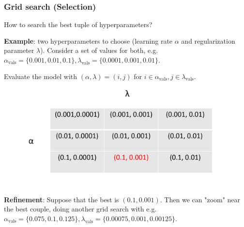 \documentclass{beamer}
\begin{document}
	\begin{frame}
		\frametitle{Grid search (Selection)}
		
		How to search the best tuple of hyperparameters?
		
		\vspace{5mm}
		
		\textbf{Example}: two hyperparameters to choose (learning rate $\alpha$ and regularization parameter $\lambda$). Consider a set of values for both, e.g. $\alpha_{\text{vals}} = \{0.001, 0.01, 0.1\}, \lambda_{\text{vals}} = \{0.0001, 0.001, 0.01\}$. 
		
		Evaluate the model with $(\alpha, \lambda) = (i,j)$ for $i \in \alpha_{\text{vals}}, j \in \lambda_{\text{vals}}$.
		
		\begin{figure}
			\centering
			\includegraphics[scale=0.4]{images/grid-search}
		\end{figure}
		
		\textbf{Refinement}: Suppose that the best is $(0.1, 0.001)$. Then we can "zoom" near the best couple, doing another grid search with e.g. $\alpha_{\text{vals}} = \{0.075, 0.1, 0.125\}, \lambda_{\text{vals}} = \{0.00075, 0.001, 0.00125\}$. 
		
	\end{frame}
\end{document}
